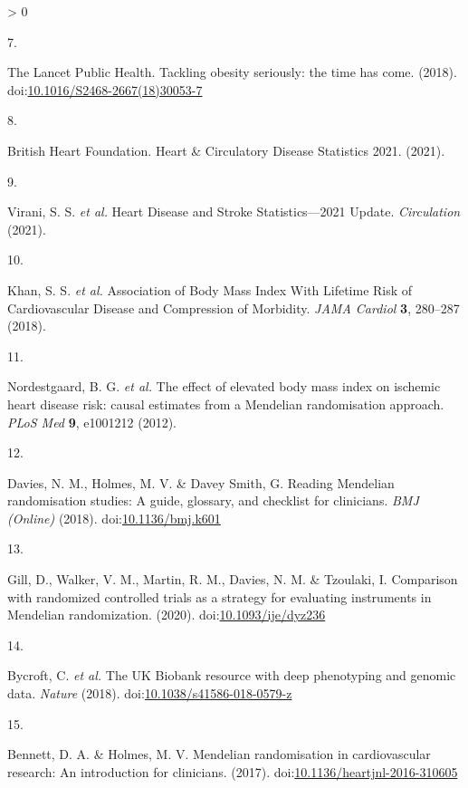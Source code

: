 \documentclass[11pt,twoside]{bristolthesis}
\newlength{\cslhangindent}
\newlength{\csllabelwidth}
\newenvironment{CSLReferences}[2] %
 {%
  \setlength{\parindent}{0pt}
  \ifodd #1 \everypar{\setlength{\hangindent}{\cslhangindent}}\ignorespaces\fi
  \ifnum #2 > 0
  \setlength{\parskip}{#2\baselineskip}
  \fi
 }%
 {}
\newcommand{\CSLLeftMargin}[1]{\parbox[t]{\csllabelwidth}{#1}}
\newcommand{\CSLRightInline}[1]{\parbox[t]{\linewidth - \csllabelwidth}{#1}\break}
\begin{document}
\begin{CSLReferences}{0}{0}
\leavevmode\hypertarget{ref-TheLancetPublicHealth2018}{}%
\CSLLeftMargin{7. }
\CSLRightInline{The Lancet Public Health. {Tackling obesity seriously: the time has come}. (2018). doi:\href{https://doi.org/10.1016/S2468-2667(18)30053-7}{10.1016/S2468-2667(18)30053-7}}

\leavevmode\hypertarget{ref-BritishHeartFoundation2021}{}%
\CSLLeftMargin{8. }
\CSLRightInline{British Heart Foundation. {Heart {\&} Circulatory Disease Statistics 2021}. (2021).}

\leavevmode\hypertarget{ref-Virani2021}{}%
\CSLLeftMargin{9. }
\CSLRightInline{Virani, S. S. \emph{et al.} {Heart Disease and Stroke Statistics---2021 Update}. \emph{Circulation} (2021).}

\leavevmode\hypertarget{ref-Khan2018}{}%
\CSLLeftMargin{10. }
\CSLRightInline{Khan, S. S. \emph{et al.} {Association of Body Mass Index With Lifetime Risk of Cardiovascular Disease and Compression of Morbidity}. \emph{JAMA Cardiol} \textbf{3}, 280--287 (2018).}

\leavevmode\hypertarget{ref-Nordestgaard2012}{}%
\CSLLeftMargin{11. }
\CSLRightInline{Nordestgaard, B. G. \emph{et al.} {The effect of elevated body mass index on ischemic heart disease risk: causal estimates from a Mendelian randomisation approach}. \emph{PLoS Med} \textbf{9}, e1001212 (2012).}

\leavevmode\hypertarget{ref-Davies2018}{}%
\CSLLeftMargin{12. }
\CSLRightInline{Davies, N. M., Holmes, M. V. \& Davey Smith, G. {Reading Mendelian randomisation studies: A guide, glossary, and checklist for clinicians}. \emph{BMJ (Online)} (2018). doi:\href{https://doi.org/10.1136/bmj.k601}{10.1136/bmj.k601}}

\leavevmode\hypertarget{ref-Gill2020}{}%
\CSLLeftMargin{13. }
\CSLRightInline{Gill, D., Walker, V. M., Martin, R. M., Davies, N. M. \& Tzoulaki, I. {Comparison with randomized controlled trials as a strategy for evaluating instruments in Mendelian randomization}. (2020). doi:\href{https://doi.org/10.1093/ije/dyz236}{10.1093/ije/dyz236}}

\leavevmode\hypertarget{ref-Bycroft2018}{}%
\CSLLeftMargin{14. }
\CSLRightInline{Bycroft, C. \emph{et al.} {The UK Biobank resource with deep phenotyping and genomic data}. \emph{Nature} (2018). doi:\href{https://doi.org/10.1038/s41586-018-0579-z}{10.1038/s41586-018-0579-z}}

\leavevmode\hypertarget{ref-Bennett2017}{}%
\CSLLeftMargin{15. }
\CSLRightInline{Bennett, D. A. \& Holmes, M. V. {Mendelian randomisation in cardiovascular research: An introduction for clinicians}. (2017). doi:\href{https://doi.org/10.1136/heartjnl-2016-310605}{10.1136/heartjnl-2016-310605}}


\end{CSLReferences}
\end{document}

